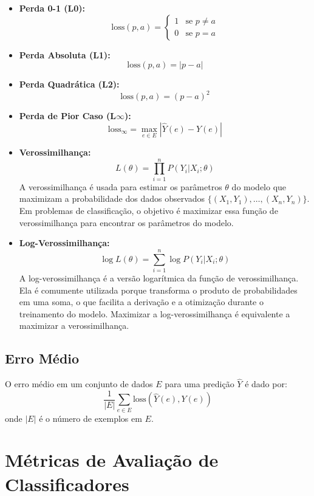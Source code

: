 \documentclass{article}
\begin{document}
\begin{itemize}
    \item \textbf{Perda 0-1 (L0):}
    \[
    \text{loss}(p, a) = \begin{cases} 
    1 & \text{se } p \neq a \\
    0 & \text{se } p = a 
    \end{cases}
    \]

    \item \textbf{Perda Absoluta (L1):}
    \[
    \text{loss}(p, a) = |p - a|
    \]

    \item \textbf{Perda Quadrática (L2):}
    \[
    \text{loss}(p, a) = (p - a)^2
    \]

    \item \textbf{Perda de Pior Caso (L$\infty$):}
    \[
    \text{loss}_{\infty} = \max_{e \in E} |\hat{Y}(e) - Y(e)|
    \]
    
    \item \textbf{Verossimilhança:}
    \[
    L(\theta) = \prod_{i=1}^{n} P(Y_i | X_i; \theta)
    \]
    A verossimilhança é usada para estimar os parâmetros $\theta$ do modelo que maximizam a probabilidade dos dados observados $\{(X_1, Y_1), \dots, (X_n, Y_n)\}$. Em problemas de classificação, o objetivo é maximizar essa função de verossimilhança para encontrar os parâmetros do modelo.

    \item \textbf{Log-Verossimilhança:}
    \[
    \log L(\theta) = \sum_{i=1}^{n} \log P(Y_i | X_i; \theta)
    \]
    A log-verossimilhança é a versão logarítmica da função de verossimilhança. Ela é comumente utilizada porque transforma o produto de probabilidades em uma soma, o que facilita a derivação e a otimização durante o treinamento do modelo. Maximizar a log-verossimilhança é equivalente a maximizar a verossimilhança.
\end{itemize}

\subsection{Erro Médio}

O erro médio em um conjunto de dados $E$ para uma predição $\hat{Y}$ é dado por:
\[
\frac{1}{|E|} \sum_{e \in E} \text{loss}(\hat{Y}(e), Y(e))
\]
onde $|E|$ é o número de exemplos em $E$.

\section{Métricas de Avaliação de Classificadores}
\end{document}
